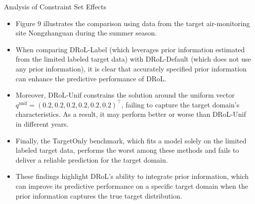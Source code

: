 \documentclass{beamer}
\begin{document}
\begin{frame}{Analysis of Constraint Set Effects}
    \begin{itemize}
        \item Figure 9 illustrates the comparison using data from the target air-monitoring site Nongzhanguan during the summer season.
        \item When comparing DRoL-Label (which leverages prior information estimated from the limited labeled target data) with DRoL-Default (which does not use any prior information), it is clear that accurately specified prior information can enhance the predictive performance of DRoL.
        \item Moreover, DRoL-Unif constrains the solution around the uniform vector $q^{\mathrm{unif}} = (0.2, 0.2, 0.2, 0.2, 0.2, 0.2)^{\intercal}$, failing to capture the target domain’s characteristics. As a result, it may perform better or worse than DRoL-Unif in different years.
        \item Finally, the TargetOnly benchmark, which fits a model solely on the limited labeled target data, performs the worst among these methods and fails to deliver a reliable prediction for the target domain.
        \item These findings highlight DRoL’s ability to integrate prior information, which can improve its predictive performance on a specific target domain when the prior information captures the true target distribution.
    \end{itemize}
\end{frame}
\end{document}
